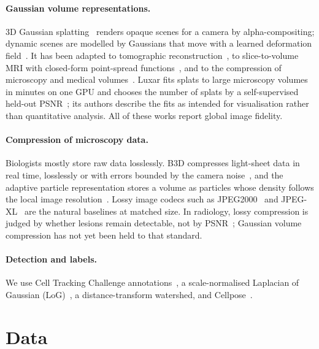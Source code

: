 \documentclass[
  paper=a4,
  fontsize=11pt,
  english,
  numbers=noenddot,
  parskip=half,
  cdgeometry=symmetric,
  cd=barcolor,
  cdfont=false
]{tudscrartcl}
\begin{document}
\paragraph{Gaussian volume representations.} 3D Gaussian splatting~\cite{kerbl2023gaussian}
renders opaque scenes for a camera by alpha-compositing; dynamic scenes are modelled by
Gaussians that move with a learned deformation field~\cite{wu2024fourd}. It has been adapted to tomographic
reconstruction~\cite{zha2024r2gaussian,li2025threedgr}, to slice-to-volume MRI with closed-form
point-spread functions~\cite{dannecker2026fast}, and to the compression of microscopy and
medical volumes~\cite{royer2026luxar,gaussianpile2026,gstoken2026,martin2026fixedbudget}. Luxar
fits splats to large microscopy volumes in minutes on one GPU and chooses the number of splats
by a self-supervised held-out PSNR~\cite{batson2019noise2self}; its authors describe the fits
as intended for visualisation rather than quantitative analysis. All of these works report
global image fidelity.

\paragraph{Compression of microscopy data.} Biologists mostly store raw data losslessly. B3D
compresses light-sheet data in real time, losslessly or with errors bounded by the camera
noise~\cite{balazs2017b3d}, and the adaptive particle representation stores a volume as
particles whose density follows the local image resolution~\cite{cheeseman2018adaptive}. Lossy
image codecs such as JPEG2000~\cite{taubman2002jpeg2000} and JPEG-XL~\cite{alakuijala2019jpegxl}
are the natural baselines at matched size. In radiology, lossy compression is judged by whether
lesions remain detectable, not by PSNR~\cite{koff2006overview}; Gaussian volume compression has
not yet been held to that standard.

\paragraph{Detection and labels.} We use Cell Tracking Challenge
annotations~\cite{ulman2017objective,maska2023cell}, a scale-normalised Laplacian of Gaussian
(LoG)~\cite{lindeberg1998feature}, a distance-transform watershed, and
Cellpose~\cite{stringer2021cellpose}.

\section{Data}\label{sec:data}
\end{document}
